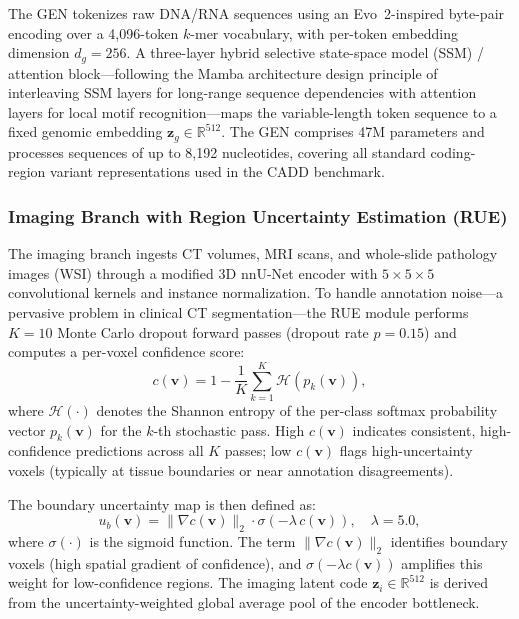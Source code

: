 \documentclass[a4paper,fleqn]{cas-dc}
\begin{document}
The GEN tokenizes raw DNA/RNA sequences using an Evo~2-inspired
\citep{evo2_2026} byte-pair encoding over a 4,096-token $k$-mer vocabulary,
with per-token embedding dimension $d_g\!=\!256$. A three-layer hybrid
selective state-space model (SSM) / attention block---following the Mamba
architecture design principle of interleaving SSM layers for long-range
sequence dependencies with attention layers for local motif recognition---maps
the variable-length token sequence to a fixed genomic embedding
$\mathbf{z}_g \in \mathbb{R}^{512}$. The GEN comprises 47M parameters and
processes sequences of up to 8,192 nucleotides, covering all standard
coding-region variant representations used in the CADD benchmark.

\subsubsection{Imaging Branch with Region Uncertainty Estimation (RUE)}

The imaging branch ingests CT volumes, MRI scans, and whole-slide pathology
images (WSI) through a modified 3D nnU-Net encoder \citep{isensee2021nnunet}
with $5\!\times\!5\!\times\!5$ convolutional kernels and instance
normalization. To handle annotation noise---a pervasive problem in clinical CT
segmentation---the RUE module performs $K\!=\!10$ Monte Carlo dropout forward
passes (dropout rate $p\!=\!0.15$) and computes a per-voxel confidence score:
\begin{equation}
c(\mathbf{v}) = 1 - \frac{1}{K}\sum_{k=1}^{K}
\mathcal{H}\!\left(p_k(\mathbf{v})\right),
\label{eq:confidence}
\end{equation}
where $\mathcal{H}(\cdot)$ denotes the Shannon entropy of the per-class
softmax probability vector $p_k(\mathbf{v})$ for the $k$-th stochastic pass.
High $c(\mathbf{v})$ indicates consistent, high-confidence predictions across
all $K$ passes; low $c(\mathbf{v})$ flags high-uncertainty voxels
(typically at tissue boundaries or near annotation disagreements).

The boundary uncertainty map is then defined as:
\begin{equation}
u_b(\mathbf{v}) = \bigl\|\nabla c(\mathbf{v})\bigr\|_2 \cdot
\sigma\!\left(-\lambda\, c(\mathbf{v})\right),\quad \lambda\!=\!5.0,
\label{eq:bunc}
\end{equation}
where $\sigma(\cdot)$ is the sigmoid function. The term
$\|\nabla c(\mathbf{v})\|_2$ identifies boundary voxels (high spatial
gradient of confidence), and $\sigma(-\lambda c(\mathbf{v}))$ amplifies this
weight for low-confidence regions. The imaging latent code
$\mathbf{z}_i \in \mathbb{R}^{512}$ is derived from the uncertainty-weighted
global average pool of the encoder bottleneck.
\end{document}
